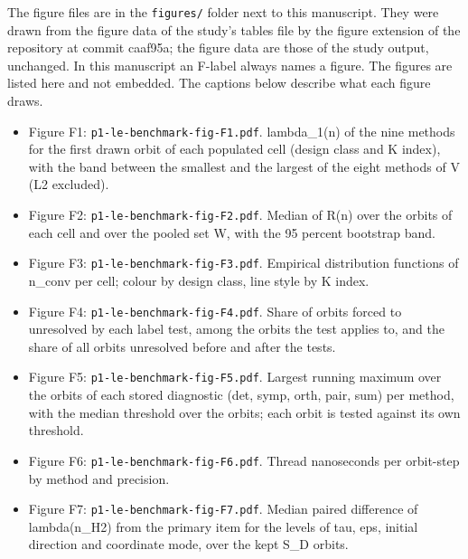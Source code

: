 \documentclass[
  11pt,
]{article}
\providecommand{\tightlist}{%
  \setlength{\itemsep}{0pt}\setlength{\parskip}{0pt}}
\begin{document}
The figure files are in the \texttt{figures/} folder next to this
manuscript. They were drawn from the figure data of the study's tables
file by the figure extension of the repository at commit caaf95a; the
figure data are those of the study output, unchanged. In this manuscript
an F-label always names a figure. The figures are listed here and not
embedded. The captions below describe what each figure draws.

\begin{itemize}
\tightlist
\item
  Figure F1: \texttt{p1-le-benchmark-fig-F1.pdf}. lambda\_1(n) of the
  nine methods for the first drawn orbit of each populated cell (design
  class and K index), with the band between the smallest and the largest
  of the eight methods of V (L2 excluded).
\item
  Figure F2: \texttt{p1-le-benchmark-fig-F2.pdf}. Median of R(n) over
  the orbits of each cell and over the pooled set W, with the 95 percent
  bootstrap band.
\item
  Figure F3: \texttt{p1-le-benchmark-fig-F3.pdf}. Empirical distribution
  functions of n\_conv per cell; colour by design class, line style by K
  index.
\item
  Figure F4: \texttt{p1-le-benchmark-fig-F4.pdf}. Share of orbits forced
  to unresolved by each label test, among the orbits the test applies
  to, and the share of all orbits unresolved before and after the tests.
\item
  Figure F5: \texttt{p1-le-benchmark-fig-F5.pdf}. Largest running
  maximum over the orbits of each stored diagnostic (det, symp, orth,
  pair, sum) per method, with the median threshold over the orbits; each
  orbit is tested against its own threshold.
\item
  Figure F6: \texttt{p1-le-benchmark-fig-F6.pdf}. Thread nanoseconds per
  orbit-step by method and precision.
\item
  Figure F7: \texttt{p1-le-benchmark-fig-F7.pdf}. Median paired
  difference of lambda(n\_H2) from the primary item for the levels of
  tau, eps, initial direction and coordinate mode, over the kept S\_D
  orbits.
\end{itemize}


\end{document}
